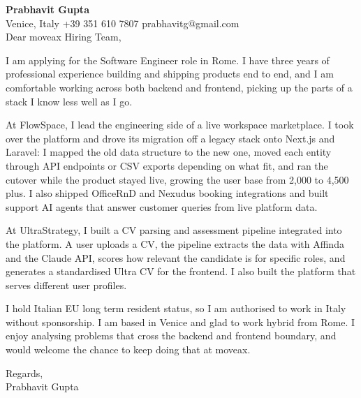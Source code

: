 \documentclass[a4paper,10.5pt]{article}
\begin{document}
\textbf{Prabhavit Gupta}\\
Venice, Italy \textbar{} +39 351 610 7807 \textbar{} prabhavitg@gmail.com\\[10pt]
Dear moveax Hiring Team,

I am applying for the Software Engineer role in Rome. I have three years of professional experience building and shipping products end to end, and I am comfortable working across both backend and frontend, picking up the parts of a stack I know less well as I go.

At FlowSpace, I lead the engineering side of a live workspace marketplace. I took over the platform and drove its migration off a legacy stack onto Next.js and Laravel: I mapped the old data structure to the new one, moved each entity through API endpoints or CSV exports depending on what fit, and ran the cutover while the product stayed live, growing the user base from 2,000 to 4,500 plus. I also shipped OfficeRnD and Nexudus booking integrations and built support AI agents that answer customer queries from live platform data.

At UltraStrategy, I built a CV parsing and assessment pipeline integrated into the platform. A user uploads a CV, the pipeline extracts the data with Affinda and the Claude API, scores how relevant the candidate is for specific roles, and generates a standardised Ultra CV for the frontend. I also built the platform that serves different user profiles.

I hold Italian EU long term resident status, so I am authorised to work in Italy without sponsorship. I am based in Venice and glad to work hybrid from Rome. I enjoy analysing problems that cross the backend and frontend boundary, and would welcome the chance to keep doing that at moveax.

Regards,\\
Prabhavit Gupta
\end{document}
